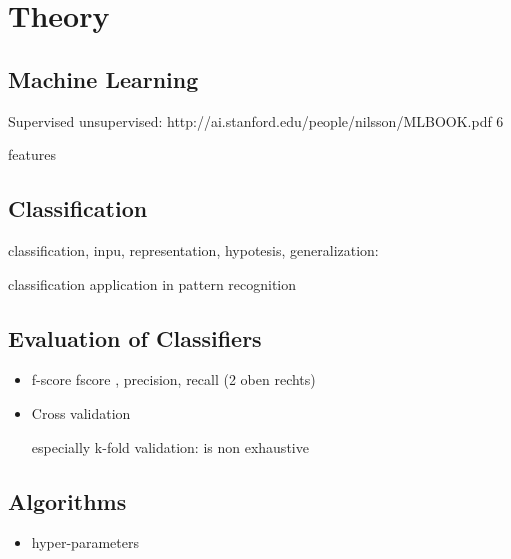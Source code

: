 \chapter{Theory}
\section{Machine Learning}
Supervised unsupervised:
http://ai.stanford.edu/people/nilsson/MLBOOK.pdf  6 

features

\section{Classification}
classification, inpu, representation, hypotesis, generalization:

classification application in pattern recognition 

\section{Evaluation of Classifiers}
\begin{itemize}
\item{f-score}
fscore , precision, recall
(2 oben rechts)
\item{Cross validation}

especially k-fold validation: 
is non exhaustive


\end{itemize}
\section{Algorithms}
\begin{itemize}
\item{hyper-parameters}
\end{itemize}
